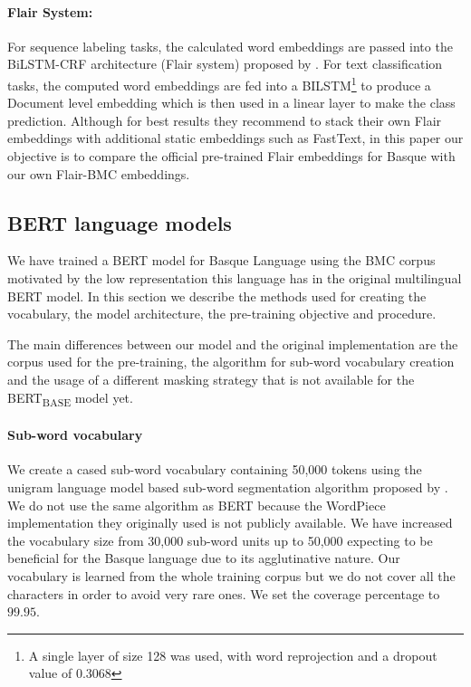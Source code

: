 \documentclass[10pt, a4paper]{article}
\begin{document}
\paragraph{Flair System:} For sequence labeling tasks, the calculated word embeddings are passed into the BiLSTM-CRF architecture (Flair system) proposed by \cite{huang2015bidirectional}. For text classification tasks, the computed word embeddings are fed into a BILSTM\footnote{A single layer of size 128 was used, with word reprojection and a dropout value of 0.3068} to produce a Document level embedding which is then used in a linear layer to make the class prediction. Although for best results they recommend to stack their own Flair embeddings with additional static embeddings such as FastText, in this paper our objective is to compare the official pre-trained Flair embeddings for Basque with our own Flair-BMC embeddings. 

\subsection{BERT language models}\label{sec:build-basq-models:bert}

We have trained a BERT \cite{devlin2019bert} model for Basque Language using the BMC corpus motivated by the low representation this language has in the original multilingual BERT model. In this section we describe the methods used for creating the vocabulary, the model architecture, the pre-training objective and procedure.

The main differences between our model and the original implementation are the corpus used for the pre-training, the algorithm for sub-word vocabulary creation and the usage of a different masking strategy that is not available for the BERT\textsubscript{BASE} model yet.

\paragraph{Sub-word vocabulary}

We create a cased sub-word vocabulary containing 50,000 tokens using the unigram language model based sub-word segmentation algorithm proposed by . We do not use the same algorithm as BERT because the WordPiece \cite{wu2016google} implementation they originally used is not publicly available. We have increased the vocabulary size from 30,000 sub-word units up to 50,000 expecting to be beneficial for the Basque language due to its agglutinative nature. Our vocabulary is learned from the whole training corpus but we do not cover all the characters in order to avoid very rare ones. We set the coverage percentage to $99.95$.
\end{document}
